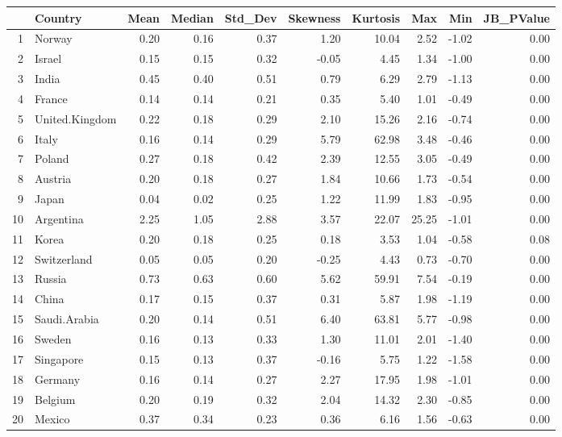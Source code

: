\documentclass[12pt,a4paper]{article}
\begin{document}
\begin{table}[ht]
    \centering
    \begin{tabular}{rlrrrrrrrr}
      \hline
     & Country & Mean & Median & Std\_Dev & Skewness & Kurtosis & Max & Min & JB\_PValue \\ 
      \hline
    1 & Norway & 0.20 & 0.16 & 0.37 & 1.20 & 10.04 & 2.52 & -1.02 & 0.00 \\ 
      2 & Israel & 0.15 & 0.15 & 0.32 & -0.05 & 4.45 & 1.34 & -1.00 & 0.00 \\ 
      3 & India & 0.45 & 0.40 & 0.51 & 0.79 & 6.29 & 2.79 & -1.13 & 0.00 \\ 
      4 & France & 0.14 & 0.14 & 0.21 & 0.35 & 5.40 & 1.01 & -0.49 & 0.00 \\ 
      5 & United.Kingdom & 0.22 & 0.18 & 0.29 & 2.10 & 15.26 & 2.16 & -0.74 & 0.00 \\ 
      6 & Italy & 0.16 & 0.14 & 0.29 & 5.79 & 62.98 & 3.48 & -0.46 & 0.00 \\ 
      7 & Poland & 0.27 & 0.18 & 0.42 & 2.39 & 12.55 & 3.05 & -0.49 & 0.00 \\ 
      8 & Austria & 0.20 & 0.18 & 0.27 & 1.84 & 10.66 & 1.73 & -0.54 & 0.00 \\ 
      9 & Japan & 0.04 & 0.02 & 0.25 & 1.22 & 11.99 & 1.83 & -0.95 & 0.00 \\ 
      10 & Argentina & 2.25 & 1.05 & 2.88 & 3.57 & 22.07 & 25.25 & -1.01 & 0.00 \\ 
      11 & Korea & 0.20 & 0.18 & 0.25 & 0.18 & 3.53 & 1.04 & -0.58 & 0.08 \\ 
      12 & Switzerland & 0.05 & 0.05 & 0.20 & -0.25 & 4.43 & 0.73 & -0.70 & 0.00 \\ 
      13 & Russia & 0.73 & 0.63 & 0.60 & 5.62 & 59.91 & 7.54 & -0.19 & 0.00 \\ 
      14 & China & 0.17 & 0.15 & 0.37 & 0.31 & 5.87 & 1.98 & -1.19 & 0.00 \\ 
      15 & Saudi.Arabia & 0.20 & 0.14 & 0.51 & 6.40 & 63.81 & 5.77 & -0.98 & 0.00 \\ 
      16 & Sweden & 0.16 & 0.13 & 0.33 & 1.30 & 11.01 & 2.01 & -1.40 & 0.00 \\ 
      17 & Singapore & 0.15 & 0.13 & 0.37 & -0.16 & 5.75 & 1.22 & -1.58 & 0.00 \\ 
      18 & Germany & 0.16 & 0.14 & 0.27 & 2.27 & 17.95 & 1.98 & -1.01 & 0.00 \\ 
      19 & Belgium & 0.20 & 0.19 & 0.32 & 2.04 & 14.32 & 2.30 & -0.85 & 0.00 \\ 
      20 & Mexico & 0.37 & 0.34 & 0.23 & 0.36 & 6.16 & 1.56 & -0.63 & 0.00 \\ 

\end{tabular}
\end{table}
\end{document}
